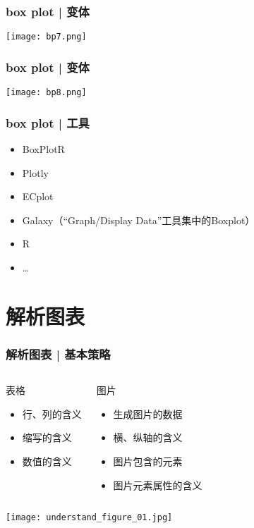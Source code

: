 \begin{frame}
  \frametitle{box plot | 变体}
  \begin{center}
    \texttt{[image: bp7.png]}
  \end{center}
\end{frame}

\begin{frame}
  \frametitle{box plot | 变体}
  \begin{center}
    \texttt{[image: bp8.png]}
  \end{center}
\end{frame}

\begin{frame}
  \frametitle{box plot | 工具}
  \begin{itemize}
    \item BoxPlotR
    \item Plotly
    \item ECplot
    \item Galaxy（“Graph/Display Data”工具集中的Boxplot）
    \item R
    \item \ldots
  \end{itemize}
\end{frame}

\section{解析图表}
\begin{frame}
  \frametitle{解析图表 | 基本策略}
  \begin{columns}
  \begin{block}{表格}
    \begin{itemize}
      \item 行、列的含义
      \item 缩写的含义
      \item 数值的含义
    \end{itemize}
  \end{block}
  \begin{block}{图片}
    \begin{itemize}
      \item 生成图片的数据
      \item 横、纵轴的含义
      \item 图片包含的元素
      \item 图片元素属性的含义
    \end{itemize}
  \end{block}
  \end{columns}
  \begin{center}
    \texttt{[image: understand\_figure\_01.jpg]}
  \end{center}
\end{frame}

